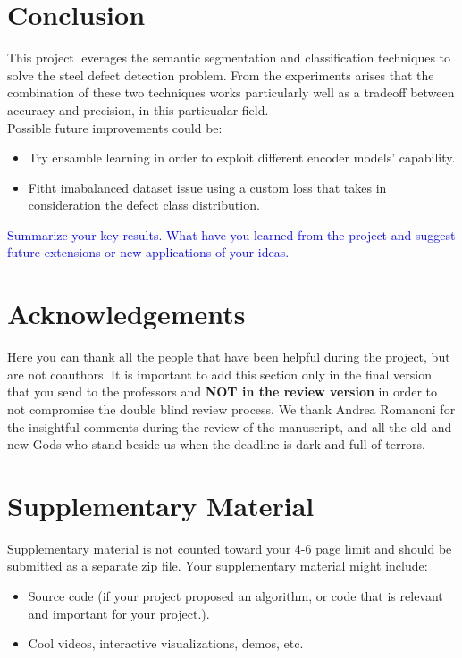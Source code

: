\documentclass[10pt,twocolumn,letterpaper]{article}
\begin{document}
\section{Conclusion} 
This project leverages the semantic segmentation and classification techniques to solve the steel defect detection problem. From the experiments arises that the combination of these two techniques works particularly well as a tradeoff between accuracy and precision, in this particualar field.\\
Possible future improvements could be:
\begin{itemize}
   \item Try ensamble learning in order to exploit different encoder models' capability.
   \item Fitht imabalanced dataset issue using a custom loss that takes in consideration the defect class distribution.
\end{itemize}

\textcolor{blue}{
Summarize your key results. What have you learned from the project and suggest future extensions or new applications of your ideas.}





\section*{Acknowledgements}
Here you can thank all the people that have been helpful during the project, but are not coauthors. It is important to add this section only in the final version that you send to the professors and \textbf{NOT in the review version} in order to not compromise the double blind review process. We thank Andrea Romanoni for the insightful comments during the review of the manuscript, and all the old and new Gods who stand beside us when the deadline is dark and full of terrors. 

\appendix
\section{Supplementary Material} 
Supplementary material is not counted toward your 4-6 page limit and should be submitted as a separate zip file. Your supplementary material might include:
\begin{itemize}
    \item Source code (if your project proposed an algorithm, or code that is relevant and important for your project.).
    \item Cool videos, interactive visualizations, demos, etc.
\end{itemize}
\end{document}
